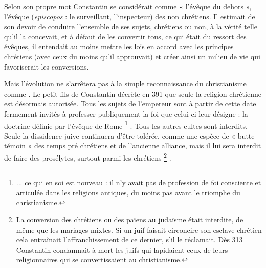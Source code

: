  Selon son propre mot Constantin se considérait comme « l'évêque du dehors », l'évêque (\emph{episcopos} : le surveillant, l'inspecteur) des non chrétiens. Il estimait de son devoir de conduire l'ensemble de ses sujets, chrétiens ou non, à la vérité telle qu'il la concevait, et à défaut de les convertir tous, ce qui était du ressort des évêques, il entendait au moins mettre les lois en accord avec les principes chrétiens (avec ceux du moins qu'il approuvait) et créer ainsi un milieu de vie qui favoriserait les conversions.

 Mais l'évolution ne s'arrêtera pas à la simple reconnaissance du christianisme comme . Le petit-fils de Constantin décrète en 391 que seule la religion chrétienne est désormais autorisée. Tous les sujets de l'empereur sont à partir de cette date fermement invités à professer publiquement la foi que celui-ci leur désigne : la doctrine définie par l'évêque de Rome%
\footnote{... ce qui en soi est nouveau : il n'y avait pas de profession de foi consciente et articulée dans les religions antiques, du moins pas avant le triomphe du christianisme.}%
. Tous les autres cultes sont interdits. Seule la dissidence juive continuera d'être tolérée, comme une espèce de « butte témoin » des temps pré chrétiens et de l'ancienne alliance, mais il lui sera interdit de faire des prosélytes, surtout parmi les chrétiens%
\footnote{La conversion des chrétiens ou des païens au judaïsme était interdite, de même que les mariages mixtes. Si un juif faisait circoncire son esclave chrétien cela entraînait  l'affranchissement de ce dernier, s'il le réclamait. Dès 313 Constantin condamnait à mort les juifs qui lapidaient ceux de leurs religionnaires qui se convertissaient au christianisme.}%
. 

